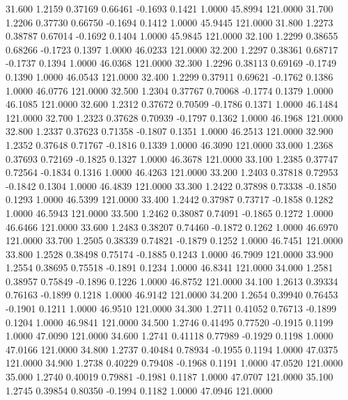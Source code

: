   31.600   1.2159   0.37169   0.66461  -0.1693   0.1421   1.0000  45.8994 121.0000
  31.700   1.2206   0.37730   0.66750  -0.1694   0.1412   1.0000  45.9445 121.0000
  31.800   1.2273   0.38787   0.67014  -0.1692   0.1404   1.0000  45.9845 121.0000
  32.100   1.2299   0.38655   0.68266  -0.1723   0.1397   1.0000  46.0233 121.0000
  32.200   1.2297   0.38361   0.68717  -0.1737   0.1394   1.0000  46.0368 121.0000
  32.300   1.2296   0.38113   0.69169  -0.1749   0.1390   1.0000  46.0543 121.0000
  32.400   1.2299   0.37911   0.69621  -0.1762   0.1386   1.0000  46.0776 121.0000
  32.500   1.2304   0.37767   0.70068  -0.1774   0.1379   1.0000  46.1085 121.0000
  32.600   1.2312   0.37672   0.70509  -0.1786   0.1371   1.0000  46.1484 121.0000
  32.700   1.2323   0.37628   0.70939  -0.1797   0.1362   1.0000  46.1968 121.0000
  32.800   1.2337   0.37623   0.71358  -0.1807   0.1351   1.0000  46.2513 121.0000
  32.900   1.2352   0.37648   0.71767  -0.1816   0.1339   1.0000  46.3090 121.0000
  33.000   1.2368   0.37693   0.72169  -0.1825   0.1327   1.0000  46.3678 121.0000
  33.100   1.2385   0.37747   0.72564  -0.1834   0.1316   1.0000  46.4263 121.0000
  33.200   1.2403   0.37818   0.72953  -0.1842   0.1304   1.0000  46.4839 121.0000
  33.300   1.2422   0.37898   0.73338  -0.1850   0.1293   1.0000  46.5399 121.0000
  33.400   1.2442   0.37987   0.73717  -0.1858   0.1282   1.0000  46.5943 121.0000
  33.500   1.2462   0.38087   0.74091  -0.1865   0.1272   1.0000  46.6466 121.0000
  33.600   1.2483   0.38207   0.74460  -0.1872   0.1262   1.0000  46.6970 121.0000
  33.700   1.2505   0.38339   0.74821  -0.1879   0.1252   1.0000  46.7451 121.0000
  33.800   1.2528   0.38498   0.75174  -0.1885   0.1243   1.0000  46.7909 121.0000
  33.900   1.2554   0.38695   0.75518  -0.1891   0.1234   1.0000  46.8341 121.0000
  34.000   1.2581   0.38957   0.75849  -0.1896   0.1226   1.0000  46.8752 121.0000
  34.100   1.2613   0.39334   0.76163  -0.1899   0.1218   1.0000  46.9142 121.0000
  34.200   1.2654   0.39940   0.76453  -0.1901   0.1211   1.0000  46.9510 121.0000
  34.300   1.2711   0.41052   0.76713  -0.1899   0.1204   1.0000  46.9841 121.0000
  34.500   1.2746   0.41495   0.77520  -0.1915   0.1199   1.0000  47.0090 121.0000
  34.600   1.2741   0.41118   0.77989  -0.1929   0.1198   1.0000  47.0166 121.0000
  34.800   1.2737   0.40484   0.78934  -0.1955   0.1194   1.0000  47.0375 121.0000
  34.900   1.2738   0.40229   0.79408  -0.1968   0.1191   1.0000  47.0520 121.0000
  35.000   1.2740   0.40019   0.79881  -0.1981   0.1187   1.0000  47.0707 121.0000
  35.100   1.2745   0.39854   0.80350  -0.1994   0.1182   1.0000  47.0946 121.0000

